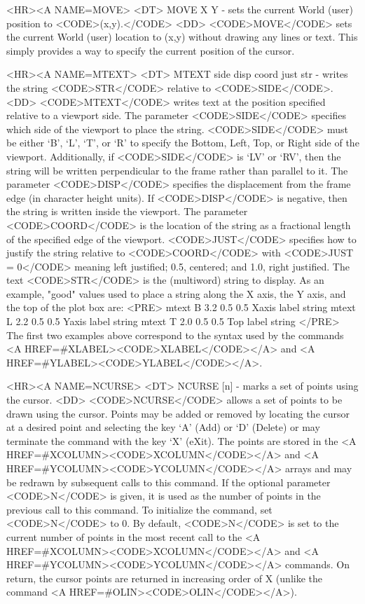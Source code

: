 \begin{rawhtml}
<HR><A NAME=MOVE>
<DT>
MOVE X Y - sets the current World (user) position to <CODE>(x,y).</CODE>
<DD>
	<CODE>MOVE</CODE> sets the current World (user) location to (x,y)
	without drawing any lines or text.  This simply provides a way to
	specify the current position of the cursor.

<HR><A NAME=MTEXT>
<DT>
MTEXT side disp coord just str - writes the string <CODE>STR</CODE> relative to <CODE>SIDE</CODE>.
<DD>
	<CODE>MTEXT</CODE> writes text at the position specified relative
	to a viewport side.  The parameter <CODE>SIDE</CODE> specifies
	which side of the viewport to place the string.  <CODE>SIDE</CODE>
	must be either `B', `L', `T', or `R' to specify the
	Bottom, Left, Top, or Right side of the viewport.
	Additionally, if <CODE>SIDE</CODE> is `LV' or `RV', then the string
	will be written perpendicular to the frame rather than parallel
	to it.  The parameter <CODE>DISP</CODE> specifies the displacement
	from the frame edge (in character height units).  If <CODE>DISP</CODE>
	is negative, then the string is written inside the viewport.  The
	parameter <CODE>COORD</CODE> is the location of the string as a
	fractional length of the specified edge of the viewport.
	<CODE>JUST</CODE> specifies how to justify the string relative to
	<CODE>COORD</CODE> with <CODE>JUST = 0</CODE> meaning left justified;
	0.5, centered; and 1.0, right justified.  The text <CODE>STR</CODE>
	is the (multiword) string to display.
	As an example, "good" values used to place a string along the X
	axis, the Y axis, and the top of the plot box are:
	<PRE>
    mtext B 3.2 0.5 0.5 Xaxis label string
    mtext L 2.2 0.5 0.5 Yaxis label string
    mtext T 2.0 0.5 0.5 Top label string
	</PRE>
	The first two examples above correspond to the syntax used by
	the commands <A HREF=#XLABEL><CODE>XLABEL</CODE></A> and
	<A HREF=#YLABEL><CODE>YLABEL</CODE></A>.

<HR><A NAME=NCURSE>
<DT>
NCURSE [n] - marks a set of points using the cursor.
<DD>
	<CODE>NCURSE</CODE> allows a set of points to be drawn using the
	cursor.  Points may be added or removed by locating the cursor
	at a desired point and selecting the key `A' (Add) or `D' (Delete)
	or may terminate the command with the key `X' (eXit).  The points
	are stored in the <A HREF=#XCOLUMN><CODE>XCOLUMN</CODE></A> and
	<A HREF=#YCOLUMN><CODE>YCOLUMN</CODE></A> arrays and may be redrawn
	by subsequent calls to this command.  If the optional parameter
	<CODE>N</CODE> is given, it is used as the number of points in the
	previous call to this command.  To initialize the command, set
	<CODE>N</CODE> to 0.  By default, <CODE>N</CODE> is set to the
	current number of points in the most recent call to the
	<A HREF=#XCOLUMN><CODE>XCOLUMN</CODE></A> and
	<A HREF=#YCOLUMN><CODE>YCOLUMN</CODE></A> commands.  On return,
	the cursor points are returned in increasing order of X (unlike
	the command <A HREF=#OLIN><CODE>OLIN</CODE></A>).


\end{rawhtml}
